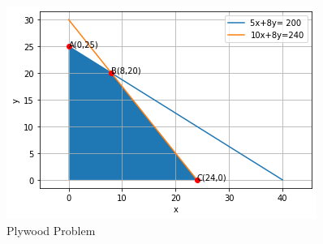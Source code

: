 \begin{figure}[!ht]
\centering
\includegraphics[width=\columnwidth]{solutions/su2021/2/18/Diagram.png}
\caption{Plywood Problem}
\label{fig:Plywood problem}	
\end{figure}

